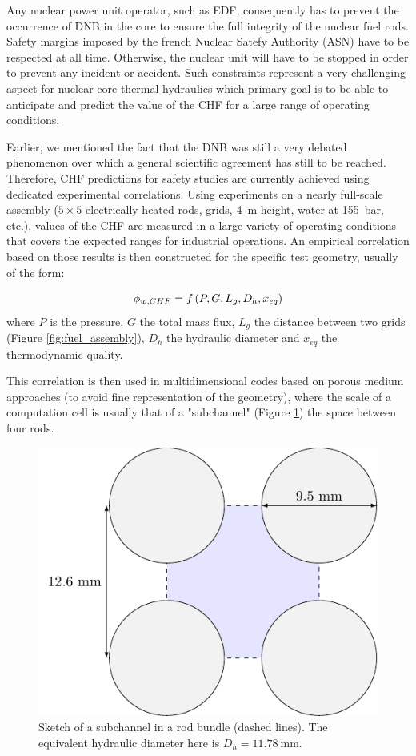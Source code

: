 \npar

Any nuclear power unit operator, such as EDF, consequently has to prevent the occurrence of DNB in the core to ensure the full integrity of the nuclear fuel rods. Safety margins imposed by the french Nuclear Satefy Authority (ASN) have to be respected at all time. Otherwise, the nuclear unit will have to be stopped in order to prevent any incident or accident. Such constraints represent a very challenging aspect for nuclear core thermal-hydraulics which primary goal is to be able to anticipate and predict the value of the CHF for a large range of operating conditions.

\npar

Earlier, we mentioned the fact that the DNB was still a very debated phenomenon over which a general scientific agreement has still to be reached. Therefore, CHF predictions for safety studies are currently achieved using dedicated experimental correlations. Using experiments on a nearly full-scale assembly ($5 \times 5$ electrically heated rods, grids, 4\ m height, water at 155\ bar, etc.), values of the CHF are measured in a large variety of operating conditions that covers the expected ranges for industrial operations. An empirical correlation based on those results is then constructed for the specific test geometry, usually of the form:

\begin{equation}
\phi_{w,CHF} = f\left( P, G, L_{g}, D_{h}, x_{eq} \right)
\end{equation}
where $P$ is the pressure, $G$ the total mass flux, $L_{g}$ the distance between two grids (Figure \ref{fig:fuel_assembly}), $D_{h}$ the hydraulic diameter and $x_{eq}$ the thermodynamic quality.


\npar

This correlation is then used in multidimensional codes based on porous medium approaches (to avoid fine representation of the geometry), where the scale of a computation cell is usually that of a "subchannel" (Figure \ref{fig:subchannel_sketch}) \ie the space between four rods.


\begin{figure}[!h]
\centering
\includegraphics[width=0.4\linewidth]{img/intro/subchannel.pdf}
\caption{Sketch of a subchannel in a rod bundle (dashed lines). The equivalent hydraulic diameter here is $D_{h}=11.78\ $mm.}
\label{fig:subchannel_sketch}
\end{figure}


